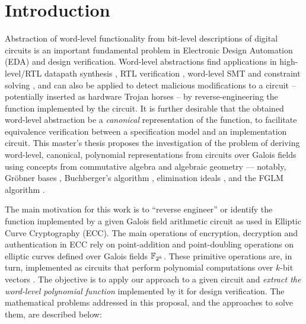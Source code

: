 \section{Introduction}

Abstraction of word-level functionality from bit-level descriptions of
digital circuits is an important fundamental problem in Electronic
Design Automation (EDA) and design verification. Word-level abstractions
find applications in high-level/RTL datapath synthesis
\cite{demicheli:iccad_98} \cite{demicheli:dac_99}
\cite{demicheli:tcad_03}, RTL verification \cite{WLS} \cite{arditi:bmd}
\cite{lpsat}, word-level SMT and constraint solving \cite{ms:research}
\cite{boolector} \cite{tew:iccad08}, and can also be
applied to detect malicious modifications to a circuit -- potentially
inserted as hardware Trojan horses -- by reverse-engineering the
function implemented by the circuit. It is further desirable that the
obtained word-level abstraction be a {\it canonical} representation of
the function, to facilitate equivalence verification between a
specification model and an implementation circuit. This master's
thesis proposes the investigation of the problem of deriving word-level,
canonical, polynomial representations from circuits over Galois fields
using concepts from commutative algebra and algebraic geometry ---
notably, Gr\"obner bases \cite{gb_book}, Buchberger's algorithm
\cite{buchberger_thesis}, elimination ideals \cite{ideals:book}, 
and the FGLM algorithm \cite{fglm}. 

The main motivation for this work is to ``reverse engineer'' or
identify the function implemented by a given Galois field arithmetic 
circuit as used in Elliptic Curve Cryptography (ECC). The main
operations of encryption, decryption and authentication in ECC rely on
point-addition and point-doubling operations on elliptic curves
defined over Galois fields ${\mathbb{F}}_{2^k}$. These primitive operations are, in
turn, implemented as circuits that perform polynomial computations
over $k$-bit vectors \cite{eccld}. 
The objective is to apply our approach to a given circuit and
{\it extract  the word-level polynomial function} implemented by
it for design verification. The mathematical problems addressed in
this proposal, and the approaches to solve them, are described below:

